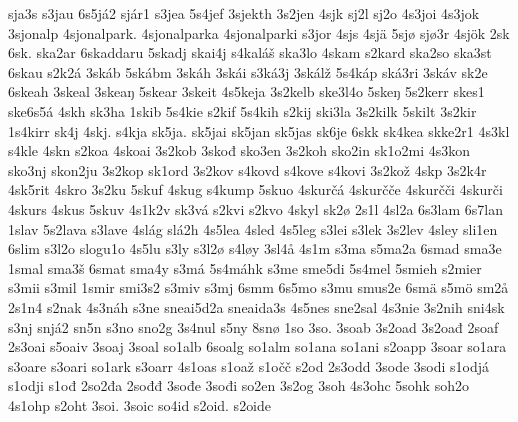 {    sja3s
    s3jau
    6s5já2
    sjár1
    s3jea
    5s4jef
    3sjekth
    3s2jen
    4sjk
    sj2l
    sj2o
    4s3joi
    4s3jok
    3sjonalp
    4sjonalpark.
    4sjonalparka
    4sjonalparki
    s3jor
    4sjs
    4sjä
    5sjø
    sjø3r
    4sjök
    2sk
    6sk.
    ska2ar
    6skaddaru
    5skadj
    skai4j
    s4kaláš
    ska3lo
    4skam
    s2kard
    ska2so
    ska3st
    6skau
    s2k2á
    3skáb
    5skábm
    3skáh
    3skái
    s3ká3j
    3skálž
    5s4káp
    ská3ri
    3skáv
    sk2e
    6skeah
    3skeal
    3skeaŋ
    5skear
    3skeit
    4s5keja
    3s2kelb
    ske3l4o
    5skeŋ
    5s2kerr
    skes1
    ske6s5á
    4skh
    sk3ha
    1skib
    5s4kie
    s2kif
    5s4kih
    s2kij
    ski3la
    3s2kilk
    5skilt
    3s2kir
    1s4kirr
    sk4j
    4skj.
    s4kja
    sk5ja.
    sk5jai
    sk5jan
    sk5jas
    sk6je
    6skk
    sk4kea
    skke2r1
    4s3kl
    s4kle
    4skn
    s2koa
    4skoai
    3s2kob
    3skođ
    sko3en
    3s2koh
    sko2in
    sk1o2mi
    4s3kon
    sko3nj
    skon2ju
    3s2kop
    sk1ord
    3s2kov
    s4kovd
    s4kove
    s4kovi
    3s2kož
    4skp
    3s2k4r
    4sk5rit
    4skro
    3s2ku
    5skuf
    4skug
    s4kump
    5skuo
    4skurčá
    4skurčče
    4skurčči
    4skurči
    4skurs
    4skus
    5skuv
    4s1k2v
    sk3vá
    s2kvi
    s2kvo
    4skyl
    sk2ø
    2s1l
    4sl2a
    6s3lam
    6s7lan
    1slav
    5s2lava
    s3lave
    4slág
    slá2h
    4s5lea
    4sled
    4s5leg
    s3lei
    s3lek
    3s2lev
    4sley
    sli1en
    6slim
    s3l2o
    slogu1o
    4s5lu
    s3ly
    s3l2ø
    s4løy
    3sl4å
    4s1m
    s3ma
    s5ma2a
    6smad
    sma3e
    1smal
    sma3š
    6smat
    sma4y
    s3má
    5s4máhk
    s3me
    sme5di
    5s4mel
    5smieh
    s2mier
    s3mii
    s3mil
    1smir
    smi3s2
    s3miv
    s3mj
    6smm
    6s5mo
    s3mu
    smus2e
    6smä
    s5mö
    sm2å
    2s1n4
    s2nak
    4s3náh
    s3ne
    sneai5d2a
    sneaida3s
    4s5nes
    sne2sal
    4s3nie
    3s2nih
    sni4sk
    s3nj
    snjá2
    sn5n
    s3no
    sno2g
    3s4nul
    s5ny
    8snø
    1so
    3so.
    3soab
    3s2oad
    3s2oađ
    2soaf
    2s3oai
    s5oaiv
    3soaj
    3soal
    so1alb
    6soalg
    so1alm
    so1ana
    so1ani
    s2oapp
    3soar
    so1ara
    s3oare
    s3oari
    so1ark
    s3oarr
    4s1oas
    s1oaž
    s1očč
    s2od
    2s3odd
    3sode
    3sodi
    s1odjá
    s1odji
    s1ođ
    2so2đa
    2sođđ
    3sođe
    3sođi
    so2en
    3s2og
    3soh
    4s3ohc
    5sohk
    soh2o
    4s1ohp
    s2oht
    3soi.
    3soic
    so4id
    s2oid.
    s2oide
}
